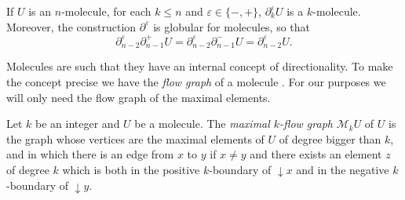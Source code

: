 \documentclass[12pt,a4paper]{article}
\numberwithin{equation}{section}
\begin{document}
\begin{lemma}\label{lem:mol_is_globular}
    If $U$ is an $n$-molecule, for each $k \leq n$ and $\varepsilon \in \{ -,+ \}$, $\partial_k^\varepsilon U$ is a $k$-molecule. Moreover, the construction $\partial^\varepsilon$ is globular for molecules, so that
    \begin{equation}
        \partial^\varepsilon_{n-2} \partial_{n-1}^+ U = \partial^\varepsilon_{n-2} \partial_{n-1}^- U = \partial^\varepsilon_{n-2} U.
    \end{equation}
\end{lemma}

Molecules are such that they have an internal concept of directionality. To make the concept precise we have the \emph{flow graph} of a molecule \cite[Def.\,4.3.1]{hadzihasanovic}. For our purposes we will only need the flow graph of the maximal elements.

\begin{definition}
    Let $k$ be an integer and $U$ be a molecule. The \emph{maximal $k$-flow graph} $\mathscr{M}_k U$ of $U$ is the graph whose vertices are the maximal elements of $U$ of degree bigger than $k$, and in which there is an edge from $x$ to $y$ if $x \neq y$ and there exists an element $z$ of degree $k$ which is both in the positive $k$-boundary of $\downarrow\! x$ and in the negative $k$-boundary of $\downarrow\! y$.
\end{definition}
\end{document}
